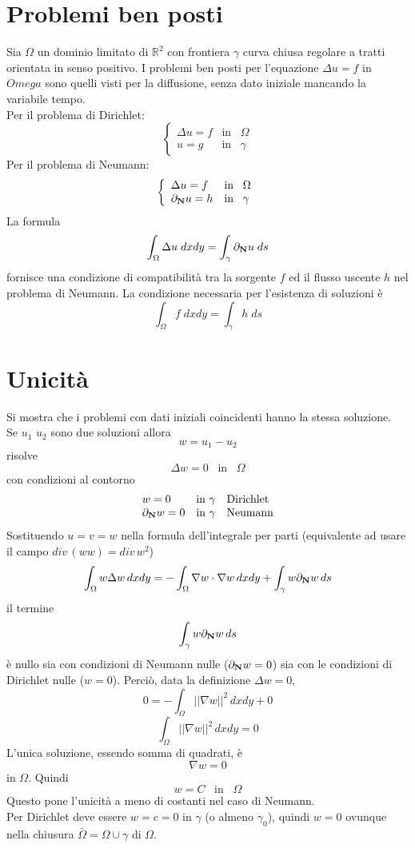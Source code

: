 \section{Problemi ben posti}
Sia $\Omega$ un dominio limitato di $\mathbb{R}^2$ con frontiera $\gamma$
curva chiusa regolare a tratti orientata in senso positivo.
I problemi ben posti per l'equazione $\Delta u= f$ in $Omega$ sono quelli
visti per la diffusione, senza dato iniziale mancando la variabile tempo.\\
Per il problema di Dirichlet:
\[
	\left\{
	\begin{array}{ll}
		\Delta u= f & \text{in} \;\;\; \Omega \\
		u= g & \text{in} \;\;\; \gamma
	\end{array}
	\right.
\]
Per il problema di Neumann:
\[
	\left\{
	\begin{array}{ll}
		\Delta u= f & \text{in} \;\;\; \Omega \\
		\partial_{\bf N}u= h & \text{in} \;\;\; \gamma
	\end{array}
	\right.
\]
La formula
\[
	\int_{\Omega} \Delta u \; dxdy=
	\int_{\gamma} \partial_{\bf N} u \; ds
\]
fornisce una condizione di compatibilit\`a tra la sorgente $f$ ed il flusso
uscente $h$ nel problema di Neumann. La condizione necessaria per l'esistenza
di soluzioni \`e
\[
	\int_{\Omega} f \; dxdy=
	\int_{\gamma} h \; ds
\]

\section{Unicit\`a}
Si mostra che i problemi con dati iniziali coincidenti hanno la stessa
soluzione.\\
Se $u_1$ $u_2$ sono due soluzioni allora
\[
	w=u_1- u_2
\]
risolve 
\[
	\Delta w = 0 \;\;\; \text{in} \;\;\; \Omega
\]
con condizioni al contorno
\[
	\begin{array}{lll}
		w=0 & \text{in } \gamma & \text{Dirichlet}\\
		\partial_{\bf N}w=0 & \text{in } \gamma & \text{Neumann}\\
	\end{array}
\]
Sostituendo $u=v=w$ nella formula dell'integrale per parti 
(equivalente ad usare il campo $div\, (ww)= div\, w^2$)
\[
	\int_{\Omega} w \Delta w \, dxdy= 
	- \int_{\Omega} \nabla w \cdot \nabla w \, dxdy
	+ \int_{\gamma} w \partial_{\bf N} w \, ds
\]
il termine
\[
	\int_{\gamma} w \partial_{\bf N} w \, ds
\]
\`e nullo sia con condizioni di Neumann nulle ($\partial_{\bf N} w =0 $) sia
con le condizioni di Dirichlet nulle ($w=0$).
Perci\`o, data la definizione $\Delta w= 0$,
\[
	0= - \int_{\Omega} \left|\left| \nabla w \right|\right|^2 \, dxdy +0
\]
\[
	\int_{\Omega} \left|\left| \nabla w \right|\right|^2 \, dxdy = 0
\]
L'unica soluzione, essendo somma di quadrati, \`e 
\[
	\nabla w=0
\]
in $\Omega$. Quindi
\[
	w=C \;\;\; \text{in} \;\;\; \Omega
\]
Questo pone l'unicit\`a a meno di costanti nel caso di Neumann.\\
Per Dirichlet deve essere $w=c=0$ in $\gamma$ (o almeno $\gamma_0$),
quindi $w=0$ ovunque nella chiusura $\bar{\Omega}= \Omega \cup \gamma$ di $\Omega$.
